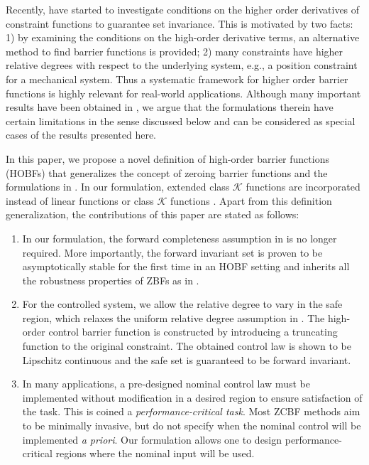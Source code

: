 \documentclass[letterpaper, 10 pt, journal, twoside]{IEEEtran}
\theoremstyle{plain}
\begin{document}
Recently,  \cite{nguyen2016exponential,xu2018constrained,xiao2019control,wences2020correct} have started to investigate conditions on the higher order derivatives of constraint functions to guarantee set invariance. This is motivated by two facts: 1)  by examining the conditions on the high-order  derivative terms, an alternative method  to find barrier functions {is} provided; 2)  many constraints have higher relative degrees with respect to the underlying system, e.g., a position constraint {for} a mechanical system. Thus a systematic framework for higher order barrier functions is highly relevant for real-world applications. Although many important results have been obtained in \cite{nguyen2016exponential,xu2018constrained,xiao2019control,wences2020correct}, we argue that the formulations therein have certain limitations in the sense discussed below and can be considered as special cases of the results presented here. 
 
In this paper, we propose a novel definition of high-order barrier functions  (HOBFs) that generalizes the concept of zeroing barrier functions \cite{Xu2015a,Ames2017}  and the formulations in \cite{nguyen2016exponential,xu2018constrained,xiao2019control,wences2020correct}. In our formulation, extended class $\mathcal{K}$ functions are incorporated instead of linear functions \cite{nguyen2016exponential,xu2018constrained} or class $\mathcal{K}$ functions \cite{xiao2019control}. Apart from this definition generalization,  the contributions of this paper are stated as follows:
 \begin{enumerate}
     \item  In our formulation, the forward completeness assumption in \cite{xu2018constrained,xiao2019control} is no longer required. More importantly,  the forward invariant set is proven to be asymptotically stable for the first time in an HOBF setting and inherits all the robustness properties of ZBFs as in \cite{Xu2015a}. 
     
     \item For the controlled system, we {allow} the relative degree {to vary} in the safe region, which relaxes the uniform relative degree assumption in \cite{xu2018constrained,xiao2019control}. The high-order control barrier function is constructed by introducing a truncating function to the original constraint. The obtained control law is shown to be Lipschitz continuous and the safe set is guaranteed to be forward invariant.  
     
     \item  In many applications,  a pre-designed nominal control law must be implemented without modification in a desired region to ensure satisfaction of the task. This is coined a \textit{performance-critical task}. {Most} ZCBF methods aim {to be} minimally invasive, but do not specify when the nominal control will be implemented \textit{a priori}. {Our formulation allows one to design}  performance-critical regions where the nominal input will be used.
 \end{enumerate}
 
\end{document}

